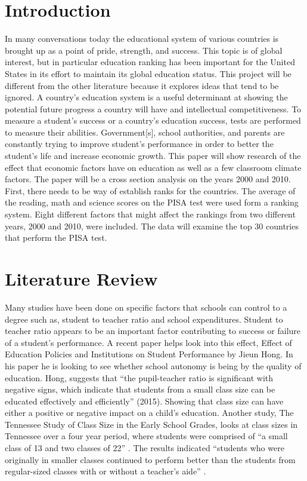 \documentclass[12pt,english]{article}
\begin{document}
\newpage
\section{Introduction}
In many conversations today the educational system of various countries is brought up as a point of pride, strength, and success. This topic is of global interest, but in particular education ranking has been important for the United States in its effort to maintain its global education status. This project will be different from the other literature because it explores ideas that tend to be ignored. A country's education system is a useful determinant at showing the potential future progress a country will have and intellectual competitiveness. To measure a student's success or a country’s education success, tests are performed to measure their abilities. Government[s], school authorities, and parents are constantly trying to improve student’s performance in order to better the student’s life and increase economic growth. This paper will show research of the effect that economic factors have on education as well as a few classroom climate factors. The paper will be a cross section analysis on the years 2000 and 2010. First, there needs to be way of establish ranks for the countries. The average of the reading, math and science scores on the PISA test were used form a ranking system. Eight different factors that might affect the rankings from two different years, 2000 and 2010, were included. The data will examine the top 30 countries that perform the PISA test.

\section{Literature Review}


Many studies have been done on specific factors that schools can control to a degree such as, student to teacher ratio and school expenditures. Student to teacher ratio appears to be an important factor contributing to success or failure of a student's performance. A recent paper helps look into this effect, Effect of Education Policies and Institutions on Student Performance by Jieun Hong. In his paper he is looking to see whether school autonomy is being by the quality of education. Hong, suggests that “the pupil-teacher ratio is significant with negative signs, which indicate that students from a small class size can be educated effectively and efficiently” (2015). Showing that class size can have either a positive or negative impact on a child's education. Another study, The Tennessee Study of Class Size in the Early School Grades, looks at class sizes in Tennessee over a four year period, where students were comprised of “a small class of 13 and two classes of 22” \cite{mosteller1995tennessee}. The results indicated “students who were originally in smaller classes continued to perform better than the students from regular-sized classes with or without a teacher’s aide” \cite{mosteller1995tennessee}.
\end{document}
